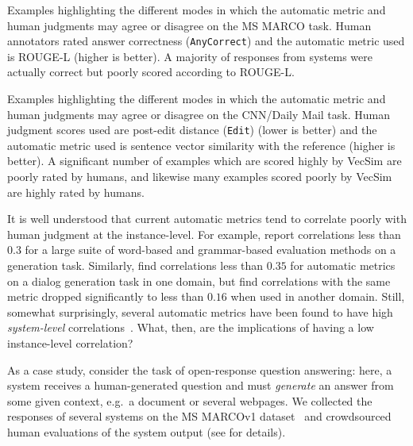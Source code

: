 \begin{table}[!p]
  \centering
  
  \caption[Examples highlighting where automatic metric and human judgments agree or disagree on MS MARCO.]{\label{tab:examples-msmarco}
    Examples highlighting the different modes in which the automatic metric and human judgments may agree or disagree on the MS MARCO task.
    Human annotators rated answer correctness (\texttt{AnyCorrect}) and the automatic metric used is ROUGE-L (higher is better).
    A majority of responses from systems were actually correct but poorly scored according to ROUGE-L.
  }
\end{table}

\begin{table}[!p]
  \centering
  
  \caption[Examples highlighting where automatic metric and human judgments agree or disagree on CNN/Daily Mail.]{\label{tab:examples-cdm}
    Examples highlighting the different modes in which the automatic metric and human judgments may agree or disagree on the CNN/Daily Mail task.
    Human judgment scores used are post-edit distance (\texttt{Edit}) (lower is better) and the automatic metric used is sentence vector similarity with the reference (higher is better).
    A significant number of examples which are scored highly by VecSim are poorly rated by humans, and likewise many examples scored poorly by VecSim are highly rated by humans.
  }
\end{table}

It is well understood that current automatic metrics tend to correlate poorly with human judgment at the instance-level.
For example, \citet{novikova2017why} report correlations less than $0.3$ for a large suite of word-based and grammar-based evaluation methods on a generation task.
Similarly, \citet{liu2016evaluate} find correlations less than $0.35$ for automatic metrics on a dialog generation task in one domain, but find correlations with the same metric dropped significantly to less than $0.16$ when used in another domain. 
Still, somewhat surprisingly, several automatic metrics have been found to have high \textit{system-level} correlations~\citep{novikova2017why}.
What, then, are the implications of having a low instance-level correlation?  

As a case study, consider the task of open-response question answering:
  here, a system receives a human-generated question and must \textit{generate} an answer from some given context, e.g.\ a document or several webpages.
  We collected the responses of several systems on the MS MARCOv1 dataset~\citep{nguyen2016ms} and crowdsourced human evaluations of the system output
  (see  for details).

